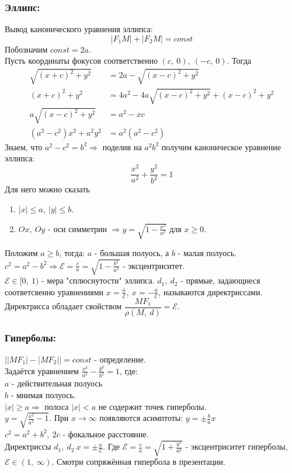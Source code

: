 \documentclass[12pt, letterpaper, twoside]{article}
\newcommand{\Underl}[1]{$\underline{\text{#1}}$}
\newcommand{\oo}{\infty}
\begin{document}
    \subsubsection*{Эллипс:}
    Вывод канонического уравнения эллипса:
    \[|F_1M| + |F_2 M| = const\]
    Побозначим $const = 2a$.\\
    Пусть координаты фокусов соответственно $(c,\ 0),\ (-c,\ 0)$. Тогда
    \begin{align*}
        \sqrt{(x + c)^2 + y^2} &= 2a - \sqrt{(x - c)^2 + y^2}\\
        (x + c)^2 + y^2 &= 4a^2 - 4a\sqrt{(x - c)^2 + y^2} + (x - c)^2 + y^2\\
        a\sqrt{(x - c)^2 + y^2} &= a^2 - xc\\
        (a^2 - c^2)x^2 + a^2 y^2 &= a^2( a^2 - c^2)
    \end{align*}
    Знаем, что $a^2 - c^2 = b^2\Rightarrow$ поделив на $a^2 b^2$ получим каноническое уравнение эллипса:
    \[\frac{x^2}{a^2} + \frac{y^2}{b^2} = 1\]
    Для него можно сказать
    \begin{enumerate}
        \item $|x| \leq a,\ |y| \leq b$.
        \item $Ox,\ Oy$ - оси симметрии $\Rightarrow y = \sqrt{1 - \frac{x^2}{a^2}}$ для $x \geq 0$.
    \end{enumerate}
    Положим $a \geq b$, тогда:
    $a$ - большая полуось, а $b$ - малая полуось.\\
    $c^2 = a^2 - b^2 \Rightarrow \mathcal{E} = \frac{c}{a} = \sqrt{1 - \frac{b^2}{a^2}}$ - эксцентриситет.\\
    $\mathcal{E} \in [0,\ 1)$ - мера "сплюснутости" эллипса. $d_1,\ d_2$ - прямые, задающиеся соответсвенно уравнениями $x = \frac{a}{\mathcal{E}},\ x = -\frac{a}{\mathcal{E}}$, называются директриссами.\\
    Директрисса обладает свойством $\dfrac{MF_1}{\rho(M,\ d)} = \mathcal{E}$.
    \subsubsection*{Гиперболы:}
    $\big| |MF_1| - |MF_2| \big| = const$ - определение.\\
    Задаётся уравнением $\frac{x^2}{a^2} - \frac{y^2}{b^2} = 1$, где:\\
    $a$ - действительная полуось\\
    $b$ - мнимая полуось.\\
    $|x| \geq a\Rightarrow$ полоса $|x| < a$ не содержит точек гиперболы.\\
    $y = \sqrt{\frac{x^2}{a^2} - 1}$. При $x\to \oo$ появляются асимптоты: $y = \pm \frac{b}{a}x$\\
    $c^2 = a^2 + b^2,\ 2c$ - фокальное расстояние.\\
    Директриссы $d_1,\ d_2\ x = \pm \frac{a}{\mathcal{E}}$. Где $\mathcal{E} = \frac{c}{a} = \sqrt{1 + \frac{b^2}{a^2}}$ - эксцентриситет гиперболы, $\mathcal{E}\in (1,\ \oo)$. Смотри \Underl{сопряжённая гипербола} в презентации.
\end{document}

